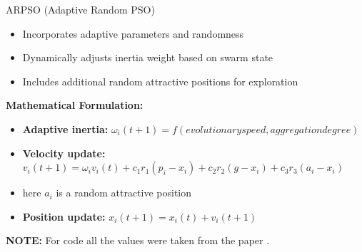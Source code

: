 \documentclass[aspectratio=169]{beamer}
\begin{document}
\begin{frame}{ARPSO (Adaptive Random PSO)}
    \begin{itemize}
        \item Incorporates adaptive parameters and randomness
        \item Dynamically adjusts inertia weight based on swarm state
        \item Includes additional random attractive positions for exploration
    \end{itemize}
    
    \textbf{Mathematical Formulation:} \\
    \begin{itemize}
        \item \textbf{Adaptive inertia:} $\omega_i(t+1) = f(evolutionary speed, aggregation degree)$
        \item \textbf{Velocity update:} $v_i(t+1) = \omega_iv_i(t) + c_1r_1(p_i-x_i) + c_2r_2(g-x_i) + c_3r_3(a_i-x_i)$
        \item here $a_i$ is a random attractive position
        \item \textbf{Position update:} $x_i(t+1) = x_i(t) + v_i(t+1)$
    \end{itemize}

    \textbf{NOTE:} For code all the values were taken from the paper \cite{10312321}.
\end{frame}
\end{document}
